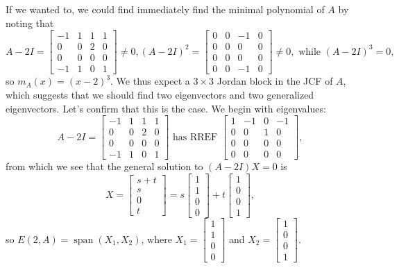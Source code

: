 \documentclass[letterpaper,12pt]{article}
\begin{document}
If we wanted to, we could find immediately find the minimal polynomial of $A$ by noting that
\[
 A-2I = \begin{bmatrix}-1&1&1&1\\0&0&2&0\\0&0&0&0\\-1&1&0&1\end{bmatrix}\neq 0, (A-2I)^2 = \begin{bmatrix}
             0&0&-1&0\\0&0&0&0\\0&0&0&0\\0&0&-1&0
            \end{bmatrix}\neq 0, \text{ while } (A-2I)^3 = 0,
\]
so $m_A(x) = (x-2)^3$. We thus expect a $3\times 3$ Jordan block in the JCF of $A$, which suggests that we should find two eigenvectors and two generalized eigenvectors. Let's confirm that this is the case. We begin with eigenvalues:
\[
 A-2I = \begin{bmatrix}-1&1&1&1\\0&0&2&0\\0&0&0&0\\-1&1&0&1\end{bmatrix} \text{ has RREF } \begin{bmatrix}1&-1&0&-1\\0&0&1&0\\0&0&0&0\\0&0&0&0\end{bmatrix},
\]
from which we see that the general solution to $(A-2I)X=0$ is
\[
 X = \begin{bmatrix}s+t\\s\\0\\t\end{bmatrix} = s\begin{bmatrix}1\\1\\0\\0\end{bmatrix} + t\begin{bmatrix}1\\0\\0\\1\end{bmatrix},
\]
so $E(2,A) = \operatorname{span}(X_1,X_2)$, where $X_1 = \begin{bmatrix}1\\1\\0\\0\end{bmatrix}$ and $X_2 = \begin{bmatrix}1\\0\\0\\1\end{bmatrix}$.
\end{document}
